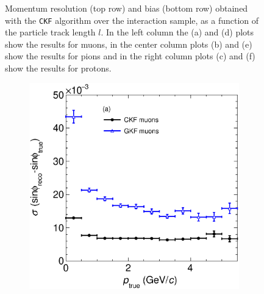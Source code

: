 \begin{figure}[t]
\begin{subfigure}{0.32\textwidth}
         \caption{}
         \label{fig:pBiasVSLength2212_Int}
     \end{subfigure}
        \caption[Momentum resolution (top row) and bias (bottom row) obtained with the \texttt{CKF}  algorithm over the interaction sample, as a function of the particle track length.]{Momentum resolution (top row) and bias (bottom row) obtained with the \texttt{CKF}  algorithm over the interaction sample, as a function of the particle track length $l$. In the left column the (a) and (d) plots show the results for muons, in the center column plots (b) and (e) show the results for pions and in the right column plots (c) and (f) show the results for protons.}
        \label{fig:pRes2DLength_Int}
\end{figure}

\begin{figure}[t]
     \centering
     \begin{subfigure}{0.32\textwidth}
         \centering
         \includegraphics[width=\textwidth]{figures/ch5-KF_NDGAr/FullSample/Int/Angle_Res/sinphi/RessinphiVSp_13.eps}
         \caption{}
         \label{fig:sinphiResVSp13_Int}
     \end{subfigure}
     \begin{subfigure}{0.32\textwidth}
         \centering

\end{subfigure}
\end{figure}
